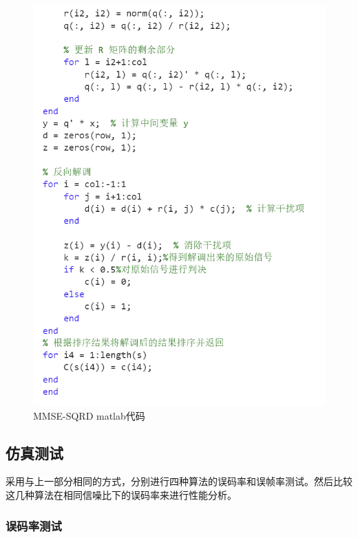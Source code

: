 \documentclass[a4paper,12pt]{article}
\begin{document}
\begin{figure}[h]
\begin{minipage}{0.4\textwidth}
			\includegraphics[width=\textwidth]{18.png}
		\end{minipage}
		\caption{MMSE-SQRD matlab代码}
	\end{figure}
		\newpage
	\subsection{仿真测试}
	采用与上一部分相同的方式，分别进行四种算法的误码率和误帧率测试。然后比较这几种算法在相同信噪比下的误码率来进行性能分析。
	\subsubsection{误码率测试}
\end{document}
